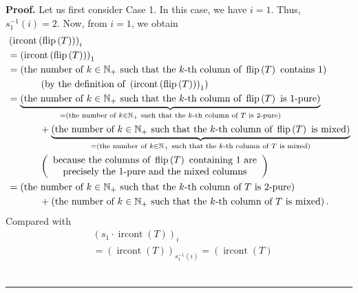 \documentclass[numbers=enddot,12pt,final,onecolumn,notitlepage]{scrartcl}%
\theoremstyle{definition}
\newenvironment{proof}[1][Proof]{\noindent\textbf{#1.} }{\ \rule{0.5em}{0.5em}}
\newenvironment{verlong}{}{}
\begin{document}
\begin{verlong}
\begin{proof}
Let us first consider Case 1. In this case, we have $i=1$. Thus, $s_{1}%
^{-1}\left(  i\right)  =2$. Now, from $i=1$, we obtain%
\begin{align*}
&  \left(  \operatorname*{ircont}\left(  \operatorname*{flip}\left(  T\right)
\right)  \right)  _{i}\\
&  =\left(  \operatorname*{ircont}\left(  \operatorname*{flip}\left(
T\right)  \right)  \right)  _{1}\\
&  =\left(  \text{the number of }k\in\mathbb{N}_{+}\text{ such that the
}k\text{-th column of }\operatorname*{flip}\left(  T\right)  \text{ contains
}1\right) \\
&  \ \ \ \ \ \ \ \ \ \ \left(  \text{by the definition of }\left(
\operatorname*{ircont}\left(  \operatorname*{flip}\left(  T\right)  \right)
\right)  _{1}\right) \\
&  =\underbrace{\left(  \text{the number of }k\in\mathbb{N}_{+}\text{ such
that the }k\text{-th column of }\operatorname*{flip}\left(  T\right)  \text{
is 1-pure}\right)  }_{=\left(  \text{the number of }k\in\mathbb{N}_{+}\text{
such that the }k\text{-th column of }T\text{ is 2-pure}\right)  }\\
&  \ \ \ \ \ \ \ \ \ \ +\underbrace{\left(  \text{the number of }%
k\in\mathbb{N}_{+}\text{ such that the }k\text{-th column of }%
\operatorname*{flip}\left(  T\right)  \text{ is mixed}\right)  }_{=\left(
\text{the number of }k\in\mathbb{N}_{+}\text{ such that the }k\text{-th column
of }T\text{ is mixed}\right)  }\\
&  \ \ \ \ \ \ \ \ \ \ \left(
\begin{array}
[c]{c}%
\text{because the columns of }\operatorname*{flip}\left(  T\right)  \text{
containing }1\text{ are}\\
\text{precisely the 1-pure and the mixed columns}%
\end{array}
\right) \\
&  =\left(  \text{the number of }k\in\mathbb{N}_{+}\text{ such that the
}k\text{-th column of }T\text{ is 2-pure}\right) \\
&  \ \ \ \ \ \ \ \ \ \ +\left(  \text{the number of }k\in\mathbb{N}_{+}\text{
such that the }k\text{-th column of }T\text{ is mixed}\right)  .
\end{align*}
Compared with%
\begin{align*}
&  \left(  s_{1}\cdot\operatorname*{ircont}\left(  T\right)  \right)  _{i}\\
&  =\left(  \operatorname*{ircont}\left(  T\right)  \right)  _{s_{1}%
^{-1}\left(  i\right)  }=\left(  \operatorname*{ircont}\left(  T\right)

\end{align*}
\end{proof}
\end{verlong}
\end{document}

